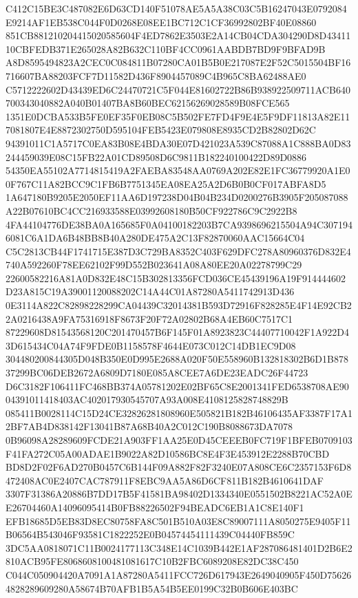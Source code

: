 \documentclass[UTF8,fontset=fandol,zihao=-4,a4paper]{ctexart}
\begin{document}
{{C412C15BE3C487082E6D63CD140F51078AE5A5A38C03C5B16247043E0792084E9214AF1EB538C044F0D0268E08EE1BC712C1CF36992802BF40E08860
851CB881210204415020585604F4ED7862E3503E2A14CB04CDA304290D8D4341110CBFEDB371E265028A82B632C110BF4CC0961AABDB7BD9F9BFAD9B
A8D8595494823A2CEC0C084811B07280CA01B5B0E217087E2F52C5015504BF16716607BA88203FCF7D11582D436F8904457089C4B965C8BA62488AE0
C5712222602D43439ED6C24470721C5F044E81602722B86B938922509711ACB640700343040882A040B01407BA8B60BEC62156269028589B08FCE565
1351E0DCBA533B5FE0EF35F0EB08C5B502FE7FD4F9E4E5F9DF11813A82E117081807E4E8872302750D595104FEB5423E079808E8935CD2B82802D62C
94391011C1A5717C0EA83B08E4BDA30E07D421023A539C87088A1C888BA0D83244459039E08C15FB22A01CD89508D6C9811B182240100422D89D0886
54350EA55102A7714815419A2FAEBA83548AA0769A202E82E1FC36779920A1E00F767C11A82BCC9C1FB6B7751345EA08EA25A2D6B0B0CF017ABFA8D5
1A647180B9205E2050EF11AA6D197238D04B04B234D0200276B3905F205087088A22B07610BC4CC216933588E03992608180B50CF922786C9C2922B8
4FA44104776DE38BA0A165685F0A04100182203B7CA9398696215504A94C3071946081C6A1DA6B48BB8B40A280DE475A2C13F82870060AAC15664C04
C5C2813CB44F1741715E387D3C729BA8352C403F629DFC278A80960376D832E4740A592260F78EE62102F99D552B023641A08A80EE20A02278799C29
22600582216A81A0D832E48C15B302813356FCD036CE45439196A19F914444602D23A815C19A39001120088202C14A44C01A87280A5411742913D436
0E3114A822C82898228299CA04439C32014381B593D72916F828285E4F14E92CB22A0216438A9FA75316918F8673F20F72A02802B68A4EB60C7517C1
87229608D81543568120C201470457B6F145F01A8923823C44407710042F1A922D43D615434C04A74F9FDE0B1158578F4644E073C012C14DB1EC9D08
304480200844305D048B350E0D995E2688A020F50E558960B132818302B6D1B87837299BC06DEB2672A6809D7180E085A8CEE7A6DE23EADC26F44723
D6C3182F106411FC468BB374A05781202E02BF65C8E2001341FED6538708AE9004391011418403AC402017930545707A93A008E4108125828748829B
085411B0028114C15D24CE32826281808960E505821B182B46106435AF3387F17A12BF7AB4D838142F13041B87A68B40A2C012C190B8088673DA7078
0B96098A28289609FCDE21A903FF1AA25E0D45CEEEB0FC719F1BFEB0709103F41FA272C05A00ADAE1B9022A82D10586BC8E4F3E453912E2288B70CBD
BD8D2F02F6AD270B0457C6B144F09A882F82F3240E07A808CE6C2357153F6D8472408AC0E2407CAC787911F8EBC9AA5A86D6CF811B182B4610641DAF
3307F31386A20886B7DD17B5F41581BA98402D1334340E0551502B8221AC52A0EE26704460A14096095414B0FB88226502F94BEADC6EB1A1C8E140F1
EFB18685D5EB83D8EC80758FA8C501B510A03E8C89007111A8050275E9405F11B06564B543046F93581C1822252E0B04574454111439C04440FB859C
3DC5AA0818071C11B0024177113C348E14C1039B442E1AF287086481401D2B6E2810ACB95FE8068608100481081617C10B2FBC6089208E82DC38C450
C044C050904420A7091A1A87280A5411FCC726D617943E2649040905F450D756264828289609280A58674B70AFB1B5A54B5EE0199C32B0B606E403BC
}}
\end{document}

